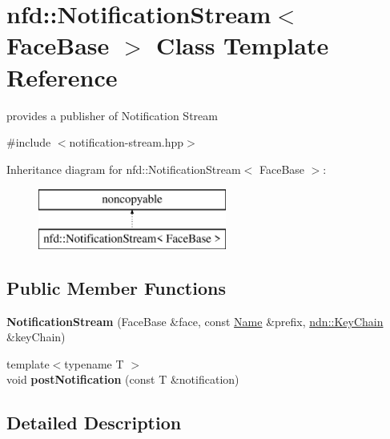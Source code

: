 \hypertarget{classnfd_1_1NotificationStream}{}\section{nfd\+:\+:Notification\+Stream$<$ Face\+Base $>$ Class Template Reference}
\label{classnfd_1_1NotificationStream}


provides a publisher of Notification Stream  




{\ttfamily \#include $<$notification-\/stream.\+hpp$>$}

Inheritance diagram for nfd\+:\+:Notification\+Stream$<$ Face\+Base $>$\+:\begin{figure}[H]
\begin{center}
\leavevmode
\includegraphics[height=2.000000cm]{classnfd_1_1NotificationStream}
\end{center}
\end{figure}
\subsection*{Public Member Functions}
\begin{DoxyCompactItemize}
\item 
{\bfseries Notification\+Stream} (Face\+Base \&face, const \hyperlink{classndn_1_1Name}{Name} \&prefix, \hyperlink{classndn_1_1security_1_1KeyChain}{ndn\+::\+Key\+Chain} \&key\+Chain)\hypertarget{classnfd_1_1NotificationStream_a13e247b8cb3fdfbb4d2560d7c08ca1d2}{}\label{classnfd_1_1NotificationStream_a13e247b8cb3fdfbb4d2560d7c08ca1d2}

\item 
{\footnotesize template$<$typename T $>$ }\\void {\bfseries post\+Notification} (const T \&notification)\hypertarget{classnfd_1_1NotificationStream_afa0f4a8118d594ecccf73743db992eb3}{}\label{classnfd_1_1NotificationStream_afa0f4a8118d594ecccf73743db992eb3}

\end{DoxyCompactItemize}


\subsection{Detailed Description}

